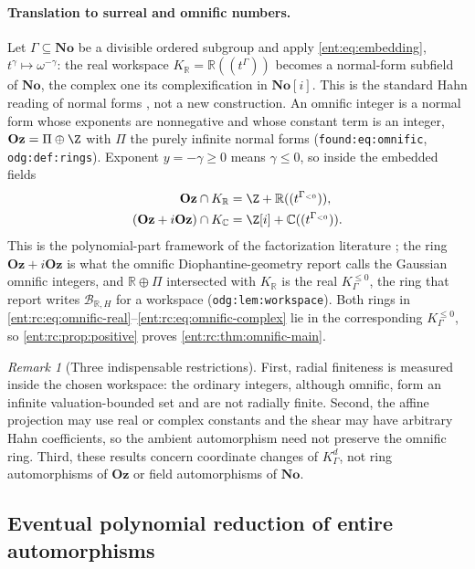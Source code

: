 \documentclass[11pt]{article}
\theoremstyle{plain}
\theoremstyle{plain}
\theoremstyle{plain}
\theoremstyle{definition}
\theoremstyle{definition}
\theoremstyle{definition}
\theoremstyle{definition}
\theoremstyle{remark}
\newtheorem{remark}[remark]{Remark}
\newcommand{\C}{\mathbb C}\newcommand{\R}{\mathbb R}
\newcommand{\No}{\mathbf{No}}
\newcommand{\K}{K_\Gamma}\newcommand{\KD}{K_\Delta}
\newcommand{\Oz}{\mathbf{Oz}}\newcommand{\Ed}{\mathcal E_{\Gamma,d}}
\newcommand{\Kle}{K_\Gamma^{\le0}}\DeclareMathOperator{\Jac}{Jac}
\begin{document}
\paragraph{Translation to surreal and omnific numbers.}
Let $\Gamma\subseteq\No$ be a divisible ordered subgroup and apply
\eqref{ent:eq:embedding}, $t^\gamma\mapsto\omega^{-\gamma}$: the real workspace
$K_{\R}=\R((t^\Gamma))$ becomes a normal-form subfield of $\No$, the complex
one its complexification in $\No[i]$. This is the standard Hahn reading of
normal forms \cite{Conway,Gonshor,MantovaMatusinski}, not a new construction.
An omnific integer is a normal form whose exponents are nonnegative and whose
constant term is an integer, $\Oz=\Pi\oplus\Z$ with $\Pi$ the purely infinite
normal forms (\texttt{found:eq:omnific}, \texttt{odg:def:rings}). Exponent
$y=-\gamma\ge0$ means $\gamma\le0$, so inside the embedded fields
\begin{align}
 \Oz\cap K_{\R}&=\Z+\R((t^{\Gamma_{<0}})),\label{ent:rc:eq:omnific-real}\\
 (\Oz+i\Oz)\cap K_{\C}&=\Z[i]+\C((t^{\Gamma_{<0}})).
 \label{ent:rc:eq:omnific-complex}
\end{align}
This is the polynomial-part framework of the factorization literature
\cite{LInnocenteMantova}; the ring $\Oz+i\Oz$ is what the omnific
Diophantine-geometry report calls the Gaussian omnific integers, and
$\R\oplus\Pi$ intersected with $K_{\R}$ is the real $\Kle$, the ring that
report writes $\mathcal B_{\R,H}$ for a workspace (\texttt{odg:lem:workspace}).
Both rings in \eqref{ent:rc:eq:omnific-real}--\eqref{ent:rc:eq:omnific-complex}
lie in the corresponding $\Kle$, so \cref{ent:rc:prop:positive} proves
\cref{ent:rc:thm:omnific-main}.

\begin{remark}[Three indispensable restrictions]\label{ent:rc:rem:restrictions}
First, radial finiteness is measured inside the chosen workspace: the ordinary
integers, although omnific, form an infinite valuation-bounded set and are not
radially finite. Second, the affine projection may use real or complex
constants and the shear may have arbitrary Hahn coefficients, so the ambient
automorphism need not preserve the omnific ring. Third, these results concern
coordinate changes of $\K^d$, not ring automorphisms of $\Oz$ or field
automorphisms of $\No$.
\end{remark}

\subsection{Eventual polynomial reduction of entire automorphisms}
\label{ent:rc:subsec:reduction}
\end{document}
